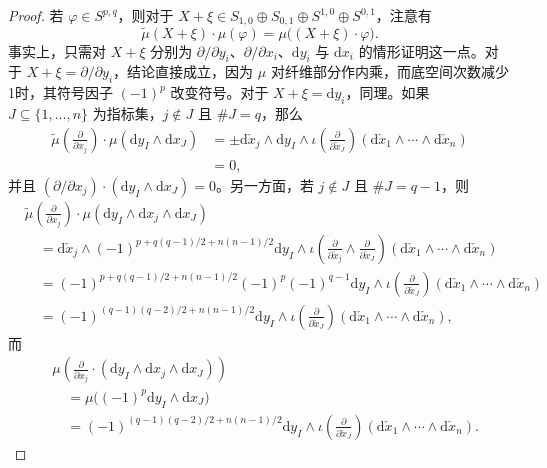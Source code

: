 \begin{proof}
若 $\varphi\in S^{p,q}$，则对于 $X+\xi\in S_{1,0}\oplus S_{0,1}\oplus S^{1,0}\oplus S^{0,1}$，注意有
\begin{equation}\label{eq:6.1}
\widetilde\mu(X+\xi)\cdot\mu(\varphi)
=\mu\bigl((X+\xi)\cdot\varphi\bigr).
\end{equation}
事实上，只需对 $X+\xi$ 分别为 $\partial/\partial y_i$、$\partial/\partial x_i$、$\mathrm dy_i$ 与 $\mathrm dx_i$ 的情形证明这一点。对于 $X+\xi=\partial/\partial y_i$，结论直接成立，因为 $\mu$ 对纤维部分作内乘，而底空间次数减少1时，其符号因子 $(-1)^p$ 改变符号。对于 $X+\xi=\mathrm dy_i$，同理。如果 $J\subseteq\{1,\ldots,n\}$ 为指标集，$j\notin J$ 且 $\#J=q$，那么
\[
\begin{aligned}
\widetilde\mu\!\left(\frac{\partial}{\partial x_j}\right)
\cdot\mu(\mathrm dy_I\wedge\mathrm dx_J)
&=\pm\mathrm d\check x_j\wedge\mathrm dy_I\wedge
\iota\!\left(\frac{\partial}{\partial\check x_J}\right)
(\mathrm d\check x_1\wedge\cdots\wedge\mathrm d\check x_n)\\
&=0,
\end{aligned}
\]
并且 $(\partial/\partial x_j)\cdot(\mathrm dy_I\wedge\mathrm dx_J)=0$。另一方面，若 $j\notin J$ 且 $\#J=q-1$，则
\[
\begin{aligned}
&\widetilde\mu\!\left(\frac{\partial}{\partial x_j}\right)
\cdot\mu(\mathrm dy_I\wedge\mathrm dx_j\wedge\mathrm dx_J)\\
&\quad=\mathrm d\check x_j\wedge(-1)^{p+q(q-1)/2+n(n-1)/2}\mathrm dy_I\wedge
\iota\!\left(\frac{\partial}{\partial\check x_j}\wedge
\frac{\partial}{\partial\check x_J}\right)
(\mathrm d\check x_1\wedge\cdots\wedge\mathrm d\check x_n)\\
&\quad=(-1)^{p+q(q-1)/2+n(n-1)/2}(-1)^p(-1)^{q-1}\mathrm dy_I\wedge
\iota\!\left(\frac{\partial}{\partial\check x_J}\right)
(\mathrm d\check x_1\wedge\cdots\wedge\mathrm d\check x_n)\\
&\quad=(-1)^{(q-1)(q-2)/2+n(n-1)/2}\mathrm dy_I\wedge
\iota\!\left(\frac{\partial}{\partial\check x_J}\right)
(\mathrm d\check x_1\wedge\cdots\wedge\mathrm d\check x_n),
\end{aligned}
\]
而
\[
\begin{aligned}
&\mu\!\left(\frac{\partial}{\partial x_j}\cdot
(\mathrm dy_I\wedge\mathrm dx_j\wedge\mathrm dx_J)\right)\\
&\quad=\mu\bigl((-1)^p\mathrm dy_I\wedge\mathrm dx_J\bigr)\\
&\quad=(-1)^{(q-1)(q-2)/2+n(n-1)/2}\mathrm dy_I\wedge
\iota\!\left(\frac{\partial}{\partial\check x_J}\right)
(\mathrm d\check x_1\wedge\cdots\wedge\mathrm d\check x_n).
\end{aligned}
\]


\end{proof}
